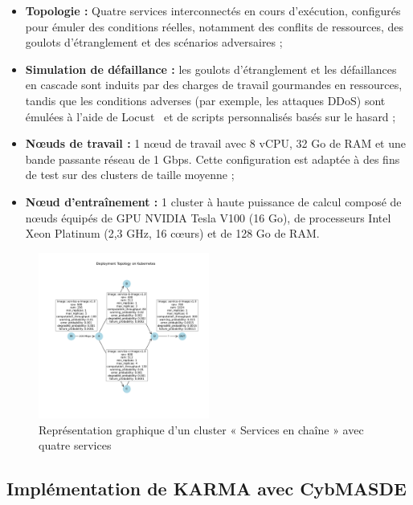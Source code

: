\begin{itemize}
    \item \textbf{Topologie :} Quatre services interconnectés en cours d'exécution, configurés pour émuler des conditions réelles, notamment des conflits de ressources, des goulots d'étranglement et des scénarios adversaires ;
    \item \textbf{Simulation de défaillance :} les goulots d'étranglement et les défaillances en cascade sont induits par des charges de travail gourmandes en ressources, tandis que les conditions adverses (par exemple, les attaques DDoS) sont émulées à l'aide de Locust~\cite{locust2021} et de scripts personnalisés basés sur le hasard ;
    \item \textbf{Nœuds de travail :} 1 nœud de travail avec 8 vCPU, 32 Go de RAM et une bande passante réseau de 1 Gbps. Cette configuration est adaptée à des fins de test sur des clusters de taille moyenne ;
    \item \textbf{Nœud d'entraînement :} 1 cluster à haute puissance de calcul composé de nœuds équipés de GPU NVIDIA Tesla V100 (16 Go), de processeurs Intel Xeon Platinum (2,3 GHz, 16 cœurs) et de 128 Go de RAM.
\end{itemize}

\begin{figure}[h!]
    \centering
    \hspace{-0,4cm}
    \includegraphics[trim=1.8cm 3.3cm 1.25cm 3.5cm, clip, width=0.5\textwidth]{figures/k8s_cluster_graph.pdf}
    \caption{Représentation graphique d'un cluster « Services en chaîne » avec quatre services}
    \label{fig:chained_services_graph}
\end{figure}

\subsection{Implémentation de KARMA avec CybMASDE}

